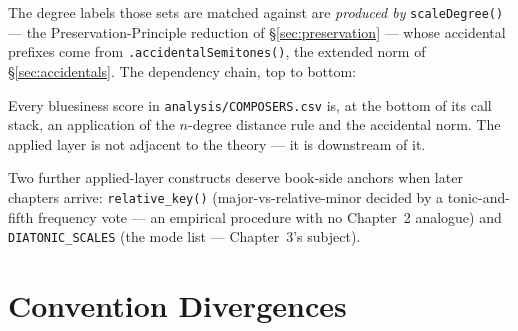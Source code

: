 \documentclass[11pt]{article}
\theoremstyle{definition}
\theoremstyle{remark}
\newcommand{\code}[1]{\texttt{#1}}
\newcommand{\file}[1]{\texttt{#1}}
\begin{document}
The degree labels those sets are matched against are \emph{produced by}
\code{scaleDegree()} --- the Preservation-Principle reduction of
\S\ref{sec:preservation} --- whose accidental prefixes come from
\code{.accidentalSemitones()}, the extended norm of \S\ref{sec:accidentals}.
The dependency chain, top to bottom:

\begin{center}
\end{center}

Every bluesiness score in \file{analysis/COMPOSERS.csv} is, at the bottom of
its call stack, an application of the $n$-degree distance rule and the
accidental norm. The applied layer is not adjacent to the theory --- it is
downstream of it.

Two further applied-layer constructs deserve book-side anchors when later
chapters arrive: \code{relative\_key()} (major-vs-relative-minor decided by a
tonic-and-fifth frequency vote --- an empirical procedure with no Chapter~2
analogue) and \code{DIATONIC\_SCALES} (the mode list --- Chapter~3's subject).

\section{Convention Divergences}\label{sec:divergences}
\end{document}
